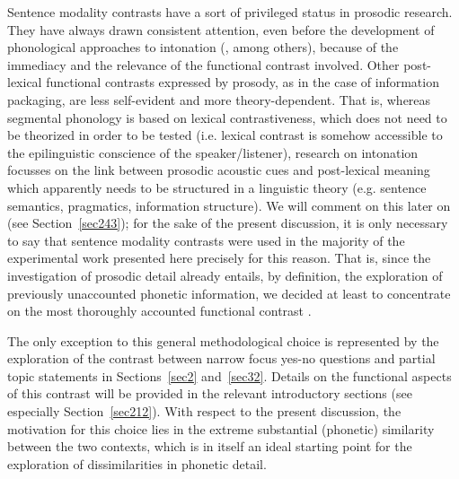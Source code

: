 Sentence modality contrasts have a sort of privileged status in prosodic research. They have always drawn consistent attention, even before the development of phonological approaches to intonation (\citealt{kretschmer1938ursprung}, among others), because of the immediacy and the relevance of the functional contrast involved. Other post-lexical functional contrasts expressed by prosody, as in the case of information packaging, are less self-evident and more theory-dependent. That is, whereas segmental phonology is based on lexical contrastiveness, which does not need to be theorized in order to be tested (i.e. lexical contrast is somehow accessible to the epilinguistic conscience of the speaker/listener), research on intonation focusses on the link between prosodic acoustic cues and post-lexical meaning which apparently needs to be structured in a linguistic theory (e.g. sentence semantics, pragmatics, information structure). We will comment on this later on (see Section~\ref{sec243}); for the sake of the present discussion, it is only necessary to say that sentence modality contrasts were used in the majority of the experimental work presented here precisely for this reason. That is, since the investigation of prosodic detail already entails, by definition, the exploration of previously unaccounted phonetic information, we decided at least to concentrate on the most thoroughly accounted functional contrast \citep{huddleston1994contrast,haan2002speaking}.

The only exception to this general methodological choice is represented by the exploration of the contrast between narrow focus yes-no questions and partial topic statements in Sections~\ref{sec2} and~\ref{sec32}. Details on the functional aspects of this contrast will be provided in the relevant introductory sections (see especially Section~\ref{sec212}). With respect to the present discussion, the motivation for this choice lies in the extreme substantial (phonetic) similarity between the two contexts, which is in itself an ideal starting point for the exploration of dissimilarities in phonetic detail.
